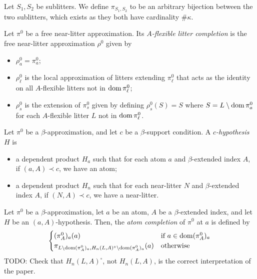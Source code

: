 \documentclass{article}
\begin{document}
\begin{definition}
    Let \( S_1, S_2 \) be sublitters.
    We define \( \pi_{S_1,S_2} \) to be an arbitrary bijection between the two sublitters, which exists as they both have cardinality \( \#\kappa \).
\end{definition}
\begin{definition}
    Let \( \pi^0 \) be a free near-litter approximation.
    Its \emph{\( A \)-flexible litter completion} is the free near-litter approximation \( \rho^0 \) given by
    \begin{itemize}
        \item \( \rho^0_a = \pi^0_a \);
        \item \( \rho^0_\ell \) is the local approximation of litters extending \( \pi^0_\ell \) that acts as the identity on all \( A \)-flexible litters not in \( \operatorname{dom} \pi^0_\ell \);
        \item \( \rho^0_s \) is the extension of \( \pi^0_s \) given by defining \( \rho^0_s(S) = S \) where \( S = L \setminus \operatorname{dom} \pi^0_a \) for each \( A \)-flexible litter \( L \) not in \( \operatorname{dom} \pi^0_\ell \).
    \end{itemize}
\end{definition}
\begin{ih}
    Let \( \pi^0 \) be a \( \beta \)-approximation, and let \( c \) be a \( \beta \)-support condition.
    A \emph{\( c \)-hypothesis} \( H \) is
    \begin{itemize}
        \item a dependent product \( H_a \) such that for each atom \( a \) and \( \beta \)-extended index \( A \), if \( (a, A) \prec c \), we have an atom;
        \item a dependent product \( H_n \) such that for each near-litter \( N \) and \( \beta \)-extended index \( A \), if \( (N, A) \prec c \), we have a near-litter.
    \end{itemize}
\end{ih}
\begin{definition}
    Let \( \pi^0 \) be a \( \beta \)-approximation, let \( a \) be an atom, \( A \) be a \( \beta \)-extended index, and let \( H \) be an \( (a, A) \)-hypothesis.
    Then, the \emph{atom completion} of \( \pi^0 \) at \( a \) is defined by
    \[ \begin{cases}
        (\pi^0_A)_a(a) & \text{if } a \in \operatorname{dom} (\pi^0_A)_a \\
        \pi_{L \setminus \operatorname{dom} (\pi^0_A)_a, H_n(L, A)^\circ \setminus \operatorname{dom} (\pi^0_A)_a}(a) & \text{otherwise}
    \end{cases} \]
    TODO: Check that \( H_n(L, A)^\circ \), not \( H_n(L, A) \), is the correct interpretation of the paper.
\end{definition}
\end{document}
